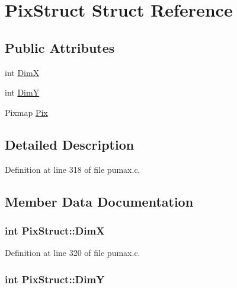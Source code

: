 \hypertarget{struct_pix_struct}{
\section{\-Pix\-Struct \-Struct \-Reference}
\label{struct_pix_struct}
}
\subsection*{\-Public \-Attributes}
\begin{DoxyCompactItemize}
\item 
int \hyperlink{struct_pix_struct_a8cfaa77a4a7e9675273fce59dc437ef4}{\-Dim\-X}
\item 
int \hyperlink{struct_pix_struct_a605b726f604da7ec98575dec3da238c8}{\-Dim\-Y}
\item 
\-Pixmap \hyperlink{struct_pix_struct_a7e7807591a26e2daa2f16ad2599a2b34}{\-Pix}
\end{DoxyCompactItemize}


\subsection{\-Detailed \-Description}


\-Definition at line 318 of file pumax.\-c.



\subsection{\-Member \-Data \-Documentation}
\hypertarget{struct_pix_struct_a8cfaa77a4a7e9675273fce59dc437ef4}{
\subsubsection[{\-Dim\-X}]{\setlength{\rightskip}{0pt plus 5cm}int {\bf \-Pix\-Struct\-::\-Dim\-X}}}
\label{struct_pix_struct_a8cfaa77a4a7e9675273fce59dc437ef4}


\-Definition at line 320 of file pumax.\-c.

\hypertarget{struct_pix_struct_a605b726f604da7ec98575dec3da238c8}{
\subsubsection[{\-Dim\-Y}]{\setlength{\rightskip}{0pt plus 5cm}int {\bf \-Pix\-Struct\-::\-Dim\-Y}}}
\label{struct_pix_struct_a605b726f604da7ec98575dec3da238c8}


